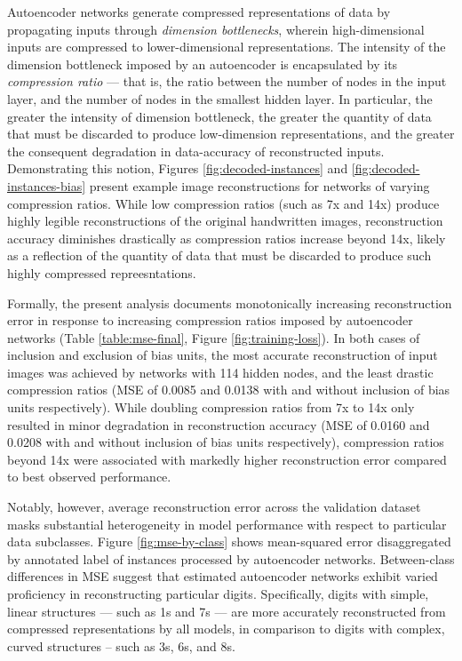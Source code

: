 
Autoencoder networks generate compressed representations of data by propagating inputs through \textit{dimension bottlenecks}, wherein high-dimensional inputs are compressed to lower-dimensional representations.
The intensity of the dimension bottleneck imposed by an autoencoder is encapsulated by its \textit{compression ratio} --- that is, the ratio between the number of nodes in the input layer, and the number of nodes in the smallest hidden layer.
In particular, the greater the intensity of dimension bottleneck, the greater the quantity of data that must be discarded to produce low-dimension representations, and the greater the consequent degradation in data-accuracy of reconstructed inputs.
Demonstrating this notion, Figures \ref{fig:decoded-instances} and \ref{fig:decoded-instances-bias} present example image reconstructions for networks of varying compression ratios.
While low compression ratios (such as 7x and 14x) produce highly legible reconstructions of the original handwritten images, reconstruction accuracy diminishes drastically as compression ratios increase beyond 14x, likely as a reflection of the quantity of data that must be discarded to produce such highly compressed repreesntations.

Formally, the present analysis documents monotonically increasing reconstruction error in response to increasing compression ratios imposed by autoencoder networks (Table \ref{table:mse-final}, Figure \ref{fig:training-loss}).
In both cases of inclusion and exclusion of bias units, the most accurate reconstruction of input images was achieved by networks with  114 hidden nodes, and the least drastic compression ratios (MSE of 0.0085 and 0.0138 with and without inclusion of bias units respectively). 
While doubling compression ratios from 7x to 14x only resulted in minor degradation in reconstruction accuracy (MSE of 0.0160 and 0.0208 with and without inclusion of bias units respectively), compression ratios beyond 14x were associated with markedly higher reconstruction error compared to best observed performance.

Notably, however, average reconstruction error across the validation dataset masks substantial heterogeneity in model performance with respect to particular data subclasses.
Figure \ref{fig:mse-by-class} shows mean-squared error disaggregated by annotated label of instances processed by autoencoder networks.
Between-class differences in MSE suggest that estimated autoencoder networks exhibit varied proficiency in reconstructing particular digits. 
Specifically, digits with simple, linear structures --- such as 1s and 7s --- are more accurately reconstructed from compressed representations by all models, in comparison to digits with complex, curved structures -- such as 3s, 6s, and 8s. 

